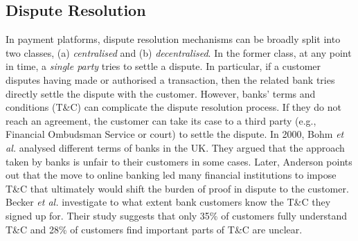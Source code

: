 \subsection{Dispute Resolution}
In payment platforms,  dispute resolution mechanisms can be broadly split into two classes, (a) \emph{centralised} and (b) \emph{decentralised}. In the former class,  at any point in time, a \emph{single party} tries to settle a dispute. In particular, if a customer disputes having made or authorised a transaction, then the related bank tries directly settle the dispute with the customer.  However,  banks' terms and conditions (T\&C) can complicate the dispute resolution process. If they do not reach an agreement, the customer can take its case to a third party (e.g., Financial Ombudsman Service or court) to settle the dispute. In 2000, Bohm \textit{et al.} \cite{BohmBG00} analysed different terms of banks in the UK. They argued that the approach taken by banks is unfair to their customers in some cases. Later,  Anderson  \cite{anderson2007closing} points out that the move to online banking led many financial institutions to impose T\&C  that ultimately would shift the burden of proof in dispute to the customer.    Becker \textit{et al.} \cite{BeckerHAABMSS17} investigate to what extent bank customers know the  T\&C they signed up for. Their study suggests that only 35\% of customers fully understand T\&C and  28\% of customers find important parts of T\&C are unclear.  











